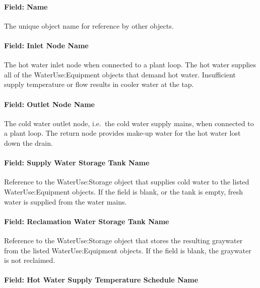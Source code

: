\paragraph{Field: Name}\label{field-name-1-048}

The unique object name for reference by other objects.

\paragraph{Field: Inlet Node Name}\label{field-inlet-node-name-008}

The hot water inlet node when connected to a plant loop. The hot water supplies all of the WaterUse:Equipment objects that demand hot water. Insufficient supply temperature or flow results in cooler water at the tap.

\paragraph{Field: Outlet Node Name}\label{field-outlet-node-name-009}

The cold water outlet node, i.e.~the cold water supply mains, when connected to a plant loop. The return node provides make-up water for the hot water lost down the drain.

\paragraph{Field: Supply Water Storage Tank Name}\label{field-supply-water-storage-tank-name-002}

Reference to the WaterUse:Storage object that supplies cold water to the listed WaterUse:Equipment objects. If the field is blank, or the tank is empty, fresh water is supplied from the water mains.

\paragraph{Field: Reclamation Water Storage Tank Name}\label{field-reclamation-water-storage-tank-name}

Reference to the WaterUse:Storage object that stores the resulting graywater from the listed WaterUse:Equipment objects. If the field is blank, the graywater is not reclaimed.

\paragraph{Field: Hot Water Supply Temperature Schedule Name}\label{field-hot-water-supply-temperature-schedule-name-1}

